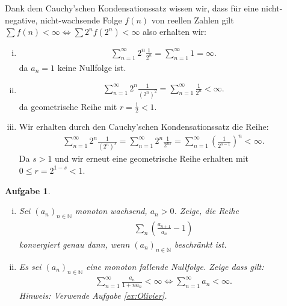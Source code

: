 \documentclass[a4paper, 20]{exam}
\newtheorem{ex}{Aufgabe}
\begin{document}
\begin{solution} Dank dem Cauchy'schen Kondensationssatz wissen wir, dass für eine nicht-negative, nicht-wachsende Folge $f(n)$ von reellen Zahlen gilt $\sum f(n) < \infty \iff \sum 2^n f(2^n) <\infty$ also erhalten wir:
\begin{enumerate}[i)]
\item 
\begin{align*}
\sum_{n=1}^\infty 2^n \frac{1}{2^n} = \sum_{n=1}^\infty 1 = \infty.
\end{align*}
da $a_n=1$ keine Nullfolge ist.
\item 
\begin{align*}
\sum_{n=1}^\infty 2^n \frac{1}{(2^n)^2 } = \sum_{n=1}^\infty \frac{1}{2^n}< \infty.
\end{align*}
da geometrische Reihe mit $r= \frac{1}{2}<1$. 

\item Wir erhalten durch den Cauchy'schen Kondensationssatz die Reihe:
\begin{align*}
 \sum_{n=1}^\infty 2^n \frac{1}{(2^n)^s} = \sum_{n=1}^\infty 2^n \frac{1}{2^{ns}} = \sum_{n=1}^\infty \left(\frac{1}{2^{s-1}}\right)^n < \infty.
\end{align*}
Da $s>1$ und wir erneut eine geometrische Reihe erhalten mit $0 \leq r = 2^{1-s} <1$. 
\end{enumerate}

\end{solution}


\begin{ex} \  \begin{enumerate}[i)]
\item Sei $(a_n)_{n \in \mathbb{N}}$ monoton wachsend,  $a_n >0$. Zeige, die Reihe 
\begin{align*}
\sum_n \left( \frac{a_{n+1}}{a_n}-1 \right)
\end{align*}
konvergiert genau dann, wenn $(a_n)_{n \in \mathbb{N}}$ beschränkt ist.
\item Es sei $(a_n)_{n \in \mathbb{N}}$ eine monoton fallende Nullfolge. Zeige dass gilt:
\begin{align*}
\sum_{n=1}^\infty \frac{a_n}{1+na_n} < \infty \iff \sum_{n=1}^\infty a_n < \infty. 
\end{align*} 
Hinweis: Verwende Aufgabe \ref{ex:Olivier}.
\end{enumerate}
\end{ex}
\end{document}
